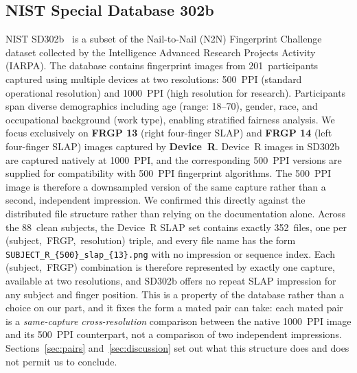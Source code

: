 \documentclass[runningheads]{llncs}
\begin{document}
\subsection{NIST Special Database 302b}

NIST SD302b~\cite{nist_sd302} is a subset of the Nail-to-Nail (N2N)
Fingerprint Challenge dataset collected by the Intelligence Advanced
Research Projects Activity (IARPA).
The database contains fingerprint images from 201~participants captured
using multiple devices at two resolutions: 500~PPI (standard operational
resolution) and 1000~PPI (high resolution for research).
Participants span diverse demographics including age (range: 18--70),
gender, race, and occupational background (work type), enabling
stratified fairness analysis.
We focus exclusively on \textbf{FRGP 13} (right four-finger SLAP) and
\textbf{FRGP 14} (left four-finger SLAP) images captured by
\textbf{Device~R}.
Device~R images in SD302b are captured natively at 1000~PPI, and the
corresponding 500~PPI versions are supplied for compatibility with
500~PPI fingerprint algorithms. The 500~PPI image is therefore a
downsampled version of the same capture rather than a second, independent
impression.
We confirmed this directly against the distributed file structure rather
than relying on the documentation alone. Across the 88~clean subjects, the
Device~R SLAP set contains exactly 352~files, one per
(subject,~FRGP,~resolution) triple, and every file name has the form
\texttt{SUBJECT\_R\_\{500\}\_slap\_\{13\}.png} with
no impression or sequence index. Each (subject,~FRGP) combination is
therefore represented by exactly one capture, available at two resolutions,
and SD302b offers no repeat SLAP impression for any subject and finger
position.
This is a property of the database rather than a choice on our part, and it
fixes the form a mated pair can take: each mated pair is a
\emph{same-capture cross-resolution} comparison between the native
1000~PPI image and its 500~PPI counterpart, not a comparison of two
independent impressions.
Sections~\ref{sec:pairs} and~\ref{sec:discussion} set out what this
structure does and does not permit us to conclude.
\end{document}
